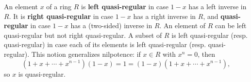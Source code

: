 An element $x$ of a ring $R$ is \textbf{left quasi-regular} in case $1 - x$ has a left inverse in $R$. It is \textbf{right quasi-regular} in case $1 - x$ has a right inverse in $R$, and \textbf{quasi-regular} in case $1 - x$ has a (two-sided) inverse in $R$. An element of $R$ can be left quasi-regular but not right quasi-regular. A subset of $R$ is left quasi-regular (resp. quasi-regular) in case each of its elements is left quasi-regular (resp. quasi-regular). This notion generalizes nilpotence: if $x \in R$ with $x^n = 0$, then
$$(1 + x + \cdots + x^{n-1})(1 - x) = 1 = (1 - x)(1 + x + \cdots + x^{n-1}),$$
so $x$ is quasi-regular.
